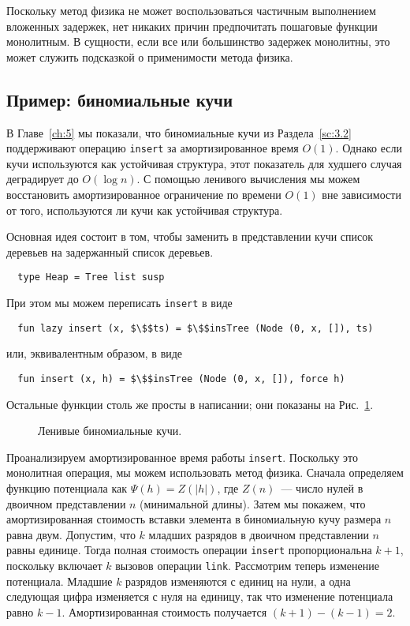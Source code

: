 Поскольку метод физика не может воспользоваться частичным выполнением
вложенных задержек, нет никаких причин предпочитать пошаговые функции
монолитным. В сущности, если все или большинство задержек монолитны,
это может служить подсказкой о применимости метода физика.

\subsection{Пример: биномиальные кучи}
\label{sc:6.4.1}

В Главе~\ref{ch:5} мы показали, что биномиальные кучи из
Раздела~\ref{sc:3.2} поддерживают операцию \lstinline!insert! за
амортизированное время $O(1)$. Однако если кучи используются как
устойчивая структура, этот показатель для худшего случая деградирует
до $O(\log n)$.  С помощью ленивого вычисления мы можем восстановить
амортизированное ограничение по времени $O(1)$ вне зависимости от
того, используются ли кучи как устойчивая структура.

Основная идея состоит в том, чтобы заменить в представлении кучи
список деревьев на задержанный список деревьев.
\begin{lstlisting}
  type Heap = Tree list susp
\end{lstlisting}
При этом мы можем переписать \lstinline!insert! в виде
\begin{lstlisting}
  fun lazy insert (x, $\$$ts) = $\$$insTree (Node (0, x, []), ts)
\end{lstlisting}
или, эквивалентным образом, в виде
\begin{lstlisting}
  fun insert (x, h) = $\$$insTree (Node (0, x, []), force h)
\end{lstlisting}
Остальные функции столь же просты в написании; они показаны на
Рис.~\ref{fig:6.2}.

\begin{figure}
  \centering
  
  \caption{Ленивые биномиальные кучи.}
  \label{fig:6.2}
\end{figure}

Проанализируем амортизированное время работы
\lstinline!insert!. Поскольку это монолитная операция, мы можем
использовать метод физика. Сначала определяем функцию потенциала как 
$\Psi(h) = Z(|h|)$, где $Z(n)$~--- число нулей в двоичном
представлении $n$ (минимальной длины). Затем мы покажем, что
амортизированная стоимость вставки элемента в биномиальную кучу
размера $n$ равна двум.  Допустим, что $k$ младших разрядов в двоичном
представлении $n$ равны единице. Тогда полная стоимость операции
\lstinline!insert! пропорциональна $k + 1$, поскольку включает $k$
вызовов операции \lstinline!link!.  Рассмотрим теперь изменение
потенциала. Младшие $k$ разрядов изменяются с единиц на нули, а одна
следующая цифра изменяется с нуля на единицу, так что изменение
потенциала равно $k - 1$. Амортизированная стоимость получается 
$(k + 1)  - (k - 1) = 2$.

